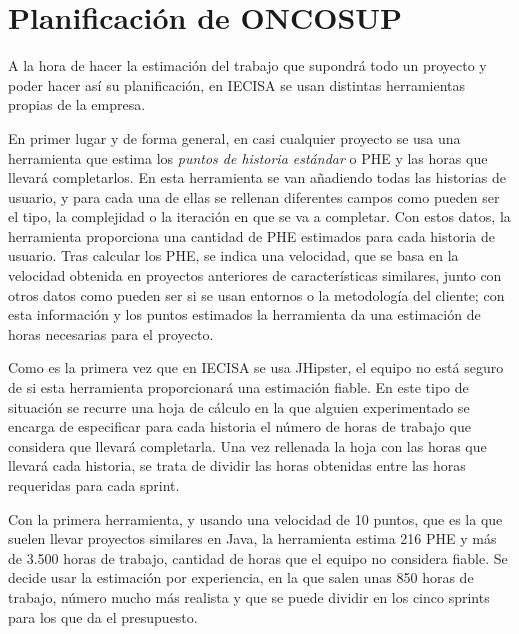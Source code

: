 \section{Planificación de ONCOSUP}
\label{planificacionONCOSUP}

A la hora de hacer la estimación del trabajo que supondrá todo un proyecto y poder hacer así su planificación, en IECISA se usan distintas herramientas propias de la empresa.

En primer lugar y de forma general, en casi cualquier proyecto se usa una herramienta que estima los \emph{puntos de historia estándar} o PHE y las horas que llevará completarlos. En esta herramienta se van añadiendo todas las historias de usuario, y para cada una de ellas se rellenan diferentes campos como pueden ser el tipo, la complejidad o la iteración en que se va a completar. Con estos datos, la herramienta proporciona una cantidad de PHE estimados para cada historia de usuario. Tras calcular los PHE, se indica una velocidad, que se basa en la velocidad obtenida en proyectos anteriores de características similares, junto con otros datos como pueden ser si se usan entornos o la metodología del cliente; con esta información y los puntos estimados la herramienta da una estimación de horas necesarias para el proyecto.

Como es la primera vez que en IECISA se usa JHipster, el equipo no está seguro de si esta herramienta proporcionará una estimación fiable. En este tipo de situación se recurre una hoja de cálculo en la que alguien experimentado se encarga de especificar para cada historia el número de horas de trabajo que considera que llevará completarla. Una vez rellenada la hoja con las horas que llevará cada historia, se trata de dividir las horas obtenidas entre las horas requeridas para cada sprint.

Con la primera herramienta, y usando una velocidad de 10 puntos, que es la que suelen llevar proyectos similares en Java, la herramienta estima 216 PHE y más de 3.500 horas de trabajo, cantidad de horas que el equipo no considera fiable. Se decide usar la estimación por experiencia, en la que salen unas 850 horas de trabajo, número mucho más realista y que se puede dividir en los cinco sprints para los que da el presupuesto.



